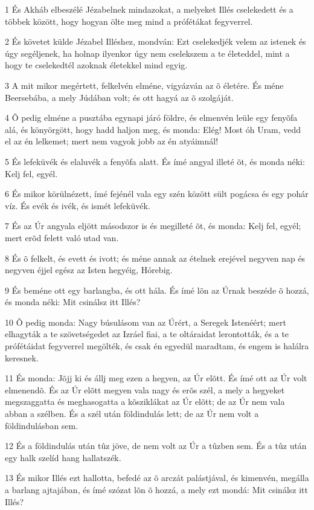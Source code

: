 \par 1 És Akháb elbeszélé Jézabelnek mindazokat, a melyeket Illés cselekedett és a többek között, hogy hogyan  ölte meg mind a prófétákat fegyverrel.
\par 2 És követet külde Jézabel Illéshez, mondván: Ezt cselekedjék velem az istenek és úgy segéljenek, ha holnap ilyenkor úgy nem cselekszem a te életeddel, mint a hogy te cselekedtél azoknak életekkel mind egyig.
\par 3 A mit mikor megértett, felkelvén elméne, vigyázván az õ életére. És méne Beersebába, a mely Júdában volt; és ott hagyá az õ szolgáját.
\par 4 Õ pedig elméne a pusztába egynapi járó földre, és elmenvén leüle egy fenyõfa alá, és könyörgött, hogy hadd haljon meg, és monda: Elég! Most óh Uram, vedd el az én lelkemet; mert nem vagyok jobb az én atyáimnál!
\par 5 És lefeküvék és elaluvék a fenyõfa alatt. És ímé angyal illeté õt, és monda néki: Kelj fel, egyél.
\par 6 És mikor körülnézett, ímé fejénél vala egy szén között sült pogácsa és egy pohár víz. És evék és ivék, és ismét lefeküvék.
\par 7 És az Úr angyala eljött másodszor is és megilleté õt, és monda: Kelj fel, egyél; mert erõd felett való utad van.
\par 8 És õ felkelt, és evett és ivott; és méne annak az ételnek erejével negyven nap és negyven éjjel egész az Isten hegyéig, Hórebig.
\par 9 És beméne ott egy barlangba, és ott hála. És ímé lõn az Úrnak beszéde õ hozzá, és monda néki: Mit csinálsz itt Illés?
\par 10 Õ pedig monda: Nagy búsulásom van az Úrért, a Seregek Istenéért; mert elhagyták a te szövetségedet az Izráel fiai, a te oltáraidat lerontották, és a te prófétáidat  fegyverrel megölték, és csak én egyedül maradtam, és engem is halálra keresnek.
\par 11 És monda: Jõjj ki és állj meg ezen a hegyen, az Úr elõtt. És ímé ott az Úr volt elmenendõ. És az Úr elõtt megyen vala nagy és erõs szél, a mely a hegyeket megszaggatta és meghasogatta a kõsziklákat az Úr elõtt; de az Úr nem  vala abban a szélben. És a szél után földindulás lett; de az Úr nem volt a földindulásban sem.
\par 12 És a földindulás után tûz jöve, de nem volt az Úr a tûzben sem. És a tûz után egy halk szelíd hang hallatszék.
\par 13 És mikor Illés ezt hallotta, befedé az õ arczát palástjával, és kimenvén, megálla a barlang ajtajában, és ímé szózat lõn õ hozzá, a mely ezt mondá: Mit csinálsz itt Illés?
